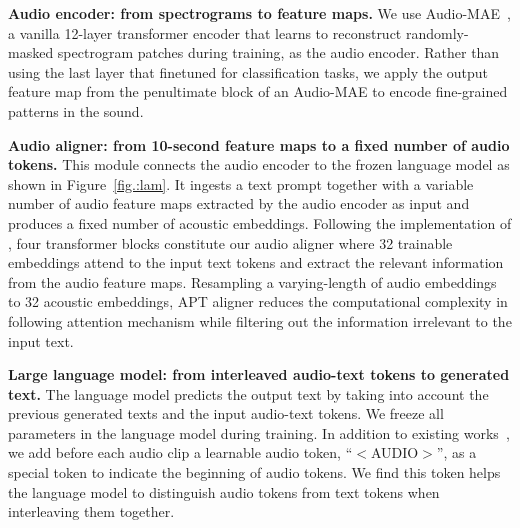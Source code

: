 \documentclass{article} %
\begin{document}
\textbf{Audio encoder: from spectrograms to feature maps.} We use Audio-MAE~\citep{huang_masked_2022}, a vanilla 12-layer transformer encoder that learns to reconstruct randomly-masked spectrogram patches during training, as the audio encoder. Rather than using the last layer that finetuned for classification tasks, we apply the output feature map from the penultimate block of an Audio-MAE to encode fine-grained patterns in the sound.

\textbf{Audio aligner: from 10-second feature maps to a fixed number of audio tokens.} This module connects the audio encoder to the frozen language model as shown in Figure~\ref{fig.:lam}. It ingests a text prompt together with a variable number of audio feature maps extracted by the audio encoder as input and produces a fixed number of acoustic embeddings. Following the implementation of \citep{li_blip-2_2023}, four transformer blocks constitute our audio aligner where 32 trainable embeddings attend to the input text tokens and extract the relevant information from the audio feature maps. Resampling a varying-length of audio embeddings to 32 acoustic embeddings, APT aligner reduces the computational complexity in following attention mechanism while filtering out the information irrelevant to the input text. 

\textbf{Large language model: from interleaved audio-text tokens to generated text.} The language model predicts the output text by taking into account the previous generated texts and the input audio-text tokens. We freeze all parameters in the language model during training. In addition to existing works~\citep{li_blip-2_2023,gong_listen_2023}, we add before each audio clip a learnable audio token, ``$<$AUDIO$>$'', as a special token to indicate the beginning of audio tokens. We find this token helps the language model to distinguish audio tokens from text tokens when interleaving them together.
\end{document}
